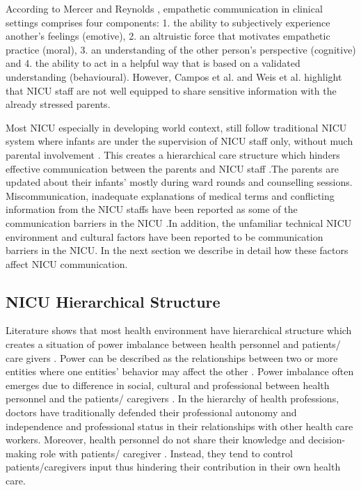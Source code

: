 According to Mercer and Reynolds \citep{Mercer2002}, empathetic communication in clinical settings comprises four components: 1. the ability to subjectively experience another’s feelings (emotive), 2. an altruistic force that motivates empathetic practice (moral), 3. an understanding of the other person’s perspective (cognitive) and 4. the ability to act in a helpful way that is based on a validated understanding (behavioural). However, Campos et al. \citep{Campos2017} and Weis et al. \citep{Weis2014} highlight that NICU staff are not well equipped to share sensitive information with the already stressed parents.  

Most NICU especially in developing world context, still follow traditional NICU system where infants are under the supervision of NICU staff only, without much parental involvement \citep{Sankar2017}. This creates a hierarchical care structure which hinders effective communication between the parents and NICU staff \citep{Jones2007a, Brock2015, Kowalski2006, Bramwell2005}.The parents are updated about their infants' mostly during ward rounds and counselling sessions. Miscommunication, inadequate explanations of medical terms and conflicting information from the NICU staffs have been reported as some of the communication barriers in the NICU \citep{Wigert2013, Coats2018, Russell2014}.In addition, the unfamiliar technical NICU environment \citep{Heidari2017} and cultural factors \citep{Rostami2015, Ramezani2014} have been reported to be communication barriers in the NICU. In the next section we describe in detail how these factors affect NICU communication.

\subsection{NICU Hierarchical Structure}
Literature shows that most health environment have hierarchical structure which creates a situation of power imbalance between health personnel and patients/ care givers \citep{Henderson2003, McDonald2012a, Molina2018, Tang2013}. Power can be described as the relationships between two or more entities where one entities’ behavior may affect the other \citep{Bristowe2014}. Power imbalance often emerges due to difference in social, cultural and professional between health personnel and the patients/ caregivers \citep{Tang2013, Rothmann2016}. In the hierarchy of health professions, doctors have traditionally defended their professional autonomy and independence and professional status in their relationships with other health care workers. Moreover, health personnel do not share their knowledge and decision-making role with patients/ caregiver \citep{Henderson2003}. Instead, they tend to control patients/caregivers input thus hindering their contribution in their own health care. 

